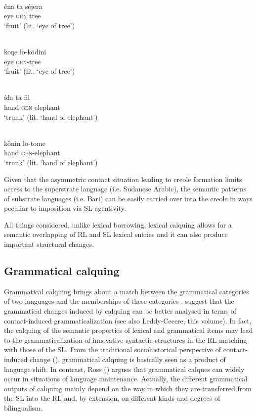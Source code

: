 \documentclass[output=paper]{langsci/langscibook}
\begin{document}
\ea\label{ex:key:tree}
 \\
\gll   éna ta séjera  \\
       eye \textsc{gen} tree \\
\glt   `fruit’ (lit. ‘eye of tree’)

\\
\gll   koŋe lo-ködini\\
       eye \textsc{gen}-tree\\
\glt   `fruit’ (lit. ‘eye of tree’)
\z
\z

\ea\label{ex:key:eleph}
 \\
\gll   ída ta fil\\
       hand \textsc{gen} elephant \\
\glt   `trunk’ (lit. ‘hand of elephant’)

\\
\gll   könin lo-tome\\
       hand \textsc{gen}-elephant \\
\glt   `trunk’ (lit. ‘hand of elephant’)
\z
\z

Given that the asymmetric contact situation leading to creole formation limits access to the superstrate language (i.e. Sudanese Arabic), the semantic patterns of substrate languages (i.e. Bari) can be easily carried over into the creole in ways peculiar to imposition via SL-agentivity. 

All things considered, unlike lexical borrowing, lexical calquing allows for a semantic overlapping of RL and SL lexical entries and it can also produce important structural changes. 


 
 \subsection{Grammatical calquing}\label{sec:gra}

Grammatical calquing brings about a match between the grammatical categories of two languages and the memberships of these categories \citep[132]{Ross2007}. \citet{HeineKuteva2005} suggest that the grammatical changes induced by calquing can be better analysed in terms of contact-induced grammaticalization (see also Leddy-Cecere, this volume). In fact, the calquing of the semantic properties of lexical and grammatical items may lead to the grammaticalization of innovative syntactic structures in the RL matching with those of the SL. From the traditional sociohistorical perspective of contact-induced change (\citealt{ThomasonKaufman1988}), grammatical calquing is basically seen as a product of language shift. In contrast, Ross (\citeyear[131]{Ross2007}) argues that grammatical calques can widely occur in situations of language maintenance. Actually, the different grammatical outputs of calquing mainly depend on the way in which they are transferred from the SL into the RL and, by extension, on different kinds and degrees of bilingualism.   
\end{document}
